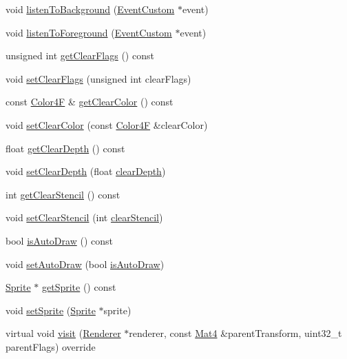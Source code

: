 \begin{DoxyCompactItemize}
\item 
void \hyperlink{classRenderTexture_a1ee79c4fa86ceae2511cd6ba4784f563}{listen\+To\+Background} (\hyperlink{classEventCustom}{Event\+Custom} $\ast$event)
\item 
void \hyperlink{classRenderTexture_adb9d5534da000cff4d4402f5049dfa11}{listen\+To\+Foreground} (\hyperlink{classEventCustom}{Event\+Custom} $\ast$event)
\item 
unsigned int \hyperlink{classRenderTexture_ab20bf288dc1db1f0a21b0a0689a8e2aa}{get\+Clear\+Flags} () const
\item 
void \hyperlink{classRenderTexture_aa7614dfcc66334421283da912887eb42}{set\+Clear\+Flags} (unsigned int clear\+Flags)
\item 
const \hyperlink{structColor4F}{Color4F} \& \hyperlink{classRenderTexture_a817a532e942a9eb456a2bb354eae2b42}{get\+Clear\+Color} () const
\item 
void \hyperlink{classRenderTexture_af4a8bbb32af1b96a23a28389b7c564d6}{set\+Clear\+Color} (const \hyperlink{structColor4F}{Color4F} \&clear\+Color)
\item 
float \hyperlink{classRenderTexture_ade767eafbb1c6214ffe3150591ed8c90}{get\+Clear\+Depth} () const
\item 
void \hyperlink{classRenderTexture_a7e72dc0bbbbfd010ae3e568bd5675a6f}{set\+Clear\+Depth} (float \hyperlink{classRenderTexture_a86d653a1a716ebe46631010e6b220568}{clear\+Depth})
\item 
int \hyperlink{classRenderTexture_a24a04ac4d778a70099d425c11df6cd02}{get\+Clear\+Stencil} () const
\item 
void \hyperlink{classRenderTexture_a56dca402afad6762c5fe3c91dae32d8b}{set\+Clear\+Stencil} (int \hyperlink{classRenderTexture_a8c6beead393100c29a32f745f9bafd76}{clear\+Stencil})
\item 
bool \hyperlink{classRenderTexture_a538e18e303e88d097d3cab36fe40cf86}{is\+Auto\+Draw} () const
\item 
void \hyperlink{classRenderTexture_af41afca2870fc8b26f4fec8d6ff89a3e}{set\+Auto\+Draw} (bool \hyperlink{classRenderTexture_a538e18e303e88d097d3cab36fe40cf86}{is\+Auto\+Draw})
\item 
\hyperlink{classSprite}{Sprite} $\ast$ \hyperlink{classRenderTexture_a89c3bcda8dbca417127adbce86cc3bb6}{get\+Sprite} () const
\item 
void \hyperlink{classRenderTexture_a68570f2b0fe7e04eb842a3ab11ffd7f7}{set\+Sprite} (\hyperlink{classSprite}{Sprite} $\ast$sprite)
\item 
virtual void \hyperlink{classRenderTexture_a57e0f63ce401e1b5915882f7be1884db}{visit} (\hyperlink{classRenderer}{Renderer} $\ast$renderer, const \hyperlink{classMat4}{Mat4} \&parent\+Transform, uint32\+\_\+t parent\+Flags) override

\end{DoxyCompactItemize}
